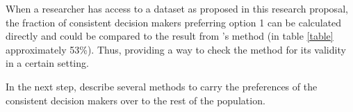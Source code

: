 When a researcher has access to a dataset as proposed in this research proposal, the fraction of consistent decision makers preferring
option 1 can be calculated directly and could be compared to the result from \textcite{goldin2020}'s method (in table \ref{table} approximately 53\%). Thus, providing
a way to check the method for its validity in a certain setting.

In the next step, \textcite[p.2769]{goldin2020} describe several methods to carry the preferences of the consistent decision makers
over to the rest of the population. 








